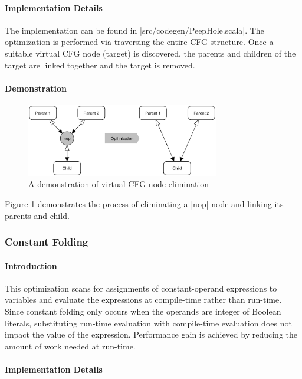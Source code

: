 \paragraph{Implementation Details}

The implementation can be found in |src/codegen/PeepHole.scala|. The optimization is performed via traversing the entire CFG structure. Once a suitable virtual CFG node (target) is discovered, the parents and children of the target are linked together and the target is removed.

\paragraph{Demonstration}
\begin{figure}[ht]
    \centering
    \includegraphics[width=0.75\textwidth]{img/virtual-cfg-node-elimination}
    \caption{A demonstration of virtual CFG node elimination}
    \label{fig:virtual-cfg-node-elimination}
\end{figure}
Figure \ref{fig:virtual-cfg-node-elimination} demonstrates the process of eliminating a |nop| node and linking its parents and child.


\subsubsection{Constant Folding}

\paragraph{Introduction}

This optimization scans for assignments of constant-operand expressions to variables and evaluate the expressions at compile-time rather than run-time. Since constant folding only occurs when the operands are integer of Boolean literals, substituting run-time evaluation with compile-time evaluation does not impact the value of the expression. Performance gain is achieved by reducing the amount of work needed at run-time.

\paragraph{Implementation Details}

